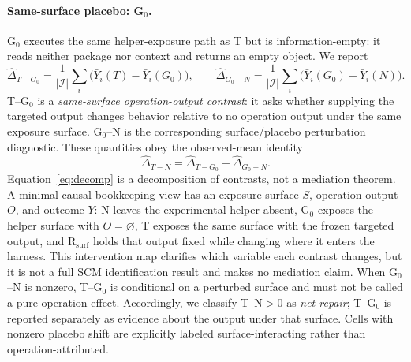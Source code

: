\paragraph{Same-surface placebo: G$_0$.}
G$_0$ executes the same helper-exposure path as T but is information-empty: it reads neither package nor context and returns an empty object. We report
\begin{equation}
\widehat{\Delta}_{T-G_0}=\frac{1}{|\mathcal I|}\sum_i\bigl(\bar Y_i(T)-\bar Y_i(G_0)\bigr),\qquad
\widehat{\Delta}_{G_0-N}=\frac{1}{|\mathcal I|}\sum_i\bigl(\bar Y_i(G_0)-\bar Y_i(N)\bigr).
\end{equation}
T--G$_0$ is a \emph{same-surface operation-output contrast}: it asks whether supplying the targeted output changes behavior relative to no operation output under the same exposure surface. G$_0$--N is the corresponding surface/placebo perturbation diagnostic. These quantities obey the observed-mean identity
\begin{equation}
\widehat{\Delta}_{T-N}=\widehat{\Delta}_{T-G_0}+\widehat{\Delta}_{G_0-N}.
\label{eq:decomp}
\end{equation}
Equation~\ref{eq:decomp} is a decomposition of contrasts, not a mediation theorem. A minimal causal bookkeeping view has an exposure surface $S$, operation output $O$, and outcome $Y$: N leaves the experimental helper absent, G$_0$ exposes the helper surface with $O=\varnothing$, T exposes the same surface with the frozen targeted output, and R$_{\mathrm{surf}}$ holds that output fixed while changing where it enters the harness. This intervention map clarifies which variable each contrast changes, but it is not a full SCM identification result and makes no mediation claim. When G$_0$--N is nonzero, T--G$_0$ is conditional on a perturbed surface and must not be called a pure operation effect. Accordingly, we classify T--N$>0$ as \emph{net repair}; T--G$_0$ is reported separately as evidence about the output under that surface. Cells with nonzero placebo shift are explicitly labeled surface-interacting rather than operation-attributed.


